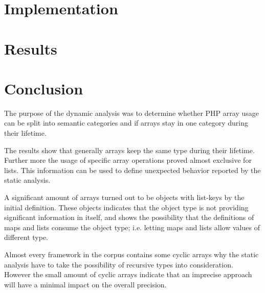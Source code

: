 \section{Implementation}
\label{sec:studyImplementation}



%

\section{Results}
\label{sec:analysisResults}




\section{Conclusion}
\label{sec:studyConclusion}
The purpose of the dynamic analysis was to determine whether PHP array usage can be split into semantic categories and if arrays stay in one category during their lifetime. 

The results show that generally arrays keep the same type during their lifetime. Further more the usage of specific array operations proved almost exclusive for lists. This information can be used to define unexpected behavior reported by the static analysis.

A significant amount of arrays turned out to be objects with list-keys by the initial definition. These objects indicates that the object type is not providing significant information in itself, and shows the possibility that the definitions of maps and lists consume the object type; i.e. letting maps and lists allow values of different type.

Almost every framework in the corpus contains some cyclic arrays why the static analysis have to take the possibility of recursive types into consideration. However the small amount of cyclic arrays indicate that an imprecise approach will have a minimal impact on the overall precision.


